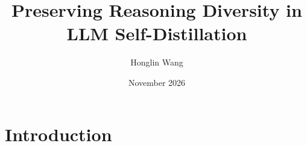 \documentclass{article}
\title{Preserving Reasoning Diversity in  LLM Self-Distillation}
\author{Honglin Wang}
\date{November 2026}
\begin{document}
\maketitle

\section{Introduction}
\end{document}
